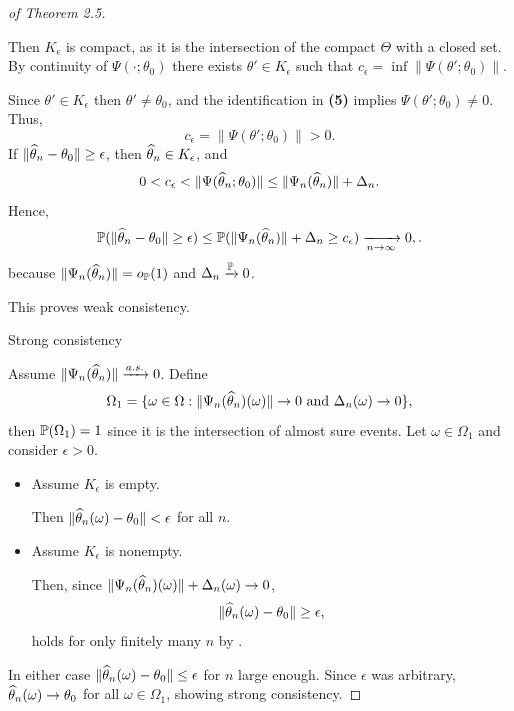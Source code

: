 \begin{proof}[of Theorem 2.5]
\begin{itemize}
   Then $K_\epsilon$ is compact, as it is the intersection of the compact $\Theta$ with a closed
   set. By continuity of $\Psi(\cdot ;\theta_0)$ there exists $\theta' \in K_{\epsilon}$ such that
   $c_\epsilon = \inf \| \Psi(\theta';\theta_0) \|$. 

   Since $\theta' \in K_\epsilon$ then $\theta' \neq \theta_0$, and the identification in
   \textbf{(5)} implies $\Psi(\theta';\theta_0) \neq 0$. Thus,
   \[
     c_\epsilon = \| \Psi(\theta';\theta_0) \|> 0
     .
   \]
   If $\| \what{\theta}_n -\theta_0 \| \ge \epsilon$, then $\what{\theta}_n \in K_\epsilon$, and 
   \begin{equation} 
   0 < c_\epsilon < \| \Psi(\what{\theta}_n;\theta_0) \| \le  \| \Psi_n(\what{\theta}_n) \|+
   \Delta_n
     \label{eq:disp1-ee-pos}
   .\end{equation}
   Hence,
   \[ 
   \P(\| \what{\theta}_n - \theta_0 \| \ge \epsilon) \le \P(\| \Psi_n(\what{\theta}_n) \| + \Delta_n
   \ge c_\epsilon) \xrightarrow[n\to \infty ]{}  0,
   .\]
   because $\| \Psi_n(\what{\theta}_n) \| = o_{\P}(1)$ and $\Delta_n \xrightarrow{\P}0 $. 
\end{itemize}
This proves weak consistency. 

\begin{description}
\item[Strong consistency] 
\end{description}
Assume $\| \Psi_n (\what{\theta}_n)\| \xrightarrow[]{a.s.} 0$. Define
\[  
\Omega_1 = \{ \omega \in \Omega : \| \Psi_n( \what{\theta}_n) (\omega) \| \to 0 \text{ and
}\Delta_n(\omega) \to 0\}
,\]
then $\P(\Omega_1)=1$ since it is the intersection of almost sure events. Let $\omega \in \Omega_1$
and consider $\epsilon > 0$.
\begin{itemize}
\item Assume $K_\epsilon$ is empty.

  Then $\| \what{\theta}_n(\omega) - \theta_0 \| < \epsilon$ for all $n$. 

\item Assume $K_\epsilon$ is nonempty.

  Then, since $\| \Psi_n(\what{\theta}_n)(\omega) \| + \Delta_n(\omega) \to 0$,
  \[ 
  \| \what{\theta}_n(\omega) - \theta_0 \| \ge \epsilon 
  ,\]
  holds for only finitely many $n$ by . 
\end{itemize}
In either case $\| \what{\theta}_n(\omega) -\theta_0 \|\le \epsilon$ for $n$ large enough. Since
$\epsilon$ was arbitrary, $\what{\theta}_n(\omega) \to \theta_0$ for all $\omega\in \Omega_1$,
showing strong consistency.


\end{proof}
